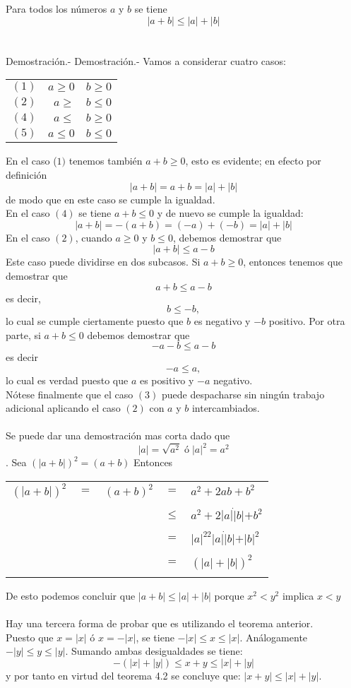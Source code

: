 \begin{teo}
Para todos los números $a$ y $b$ se tiene $$|a+b|\leq |a| + |b|$$\\\\
Demostración.- \; Demostración.- \; Vamos a considerar cuatro casos:
\begin{center}
\begin{tabular}{c r r}
$(1)$&$a\geq 0$&$b\geq 0$\\
$(2)$&$a\geq $&$b\leq 0$\\
$(4)$&$a\leq $&$b \geq 0$\\
$(5)$&$a\leq 0$&$b \leq 0$\\
\end{tabular}
\end{center}
En el caso ($1)$ tenemos también $a+b\geq 0$, esto es evidente; en efecto por definición $$|a+b|=a+b=|a|+|b|$$ de modo que en este caso se cumple la igualdad.\\
En el caso $(4)$ se tiene $a+b\leq 0$ y de nuevo se cumple la igualdad: $$|a+b|=-(a+b)=(-a)+(-b)=|a|+|b|$$
En el caso $(2)$, cuando $a\geq 0$ y $b\leq 0$, debemos demostrar que $$|a+b|\leq a - b$$ Este caso puede dividirse en dos subcasos. Si $a+b\geq 0$, entonces tenemos que demostrar que $$a+b \leq a-b$$ es decir, $$b\leq -b,$$  lo cual se cumple ciertamente puesto que $b$ es negativo y $-b$ positivo. Por otra parte, si $a+b\leq 0$ debemos demostrar que $$-a-b\leq a-b$$ es decir $$-a\leq a,$$ lo cual es verdad puesto que $a$ es positivo y \; $-a$ negativo.\\
Nótese finalmente que el caso $(3)$ puede despacharse sin ningún trabajo adicional aplicando el caso $(2)$ con $a$ \; y \; $b$ intercambiados.\\\\ 
Se puede dar una demostración mas corta dado que $$|a|=\sqrt{a^2} \; ó \; |a|^2=a^2$$. Sea $(|a+b|)^2=(a+b)$ Entonces 
\begin{center}
\begin{tabular}{r c r c l}
$(|a+b|)^2$&$=$&$(a+b)^2$&$=$&$a^2+2ab+b^2$\\\\
&&&$\leq$&$a^2+2|a|\dot |b|+b^2$\\\\
&&&$=$&$|a|^22|a|\dot |b|+|b|^2$\\\\
&&&$=$&$(|a|+|b|)^2$\\\\
\end{tabular}
\end{center}
De esto podemos concluir que $|a+b|\leq |a|+|b|$ porque $x^2<y^2$ implica $x<y$\\\\
Hay una tercera forma de probar que es utilizando el teorema anterior.\\
Puesto que $x=|x|$ \; ó \; $x=-|x|$, se tiene $-|x|\leq x \leq |x|$. Análogamente $-|y| \leq y \leq |y|$. Sumando ambas desigualdades se tiene: $$-(|x|+|y|)\leq x+y \leq |x|+|y|$$ y por tanto en virtud del teorema 4.2 se concluye que: $|x+y|\leq |x|+|y|$.
\end{teo}

